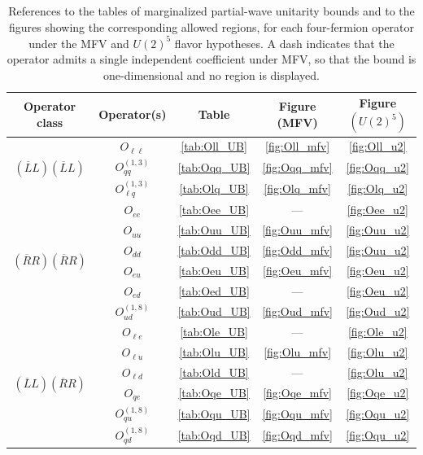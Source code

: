 \begin{table}[htbp]
\renewcommand{\arraystretch}{1.2}
    \centering
    \begin{tabular}{ccccc}
    \toprule
    \rowcolor{hdrcolor} \textbf{Operator class} & \textbf{Operator(s)} & \textbf{Table} & \textbf{Figure (MFV)} & \textbf{Figure} \boldmath$(U(2)^5)$ \\
    \midrule
    \multirow{3}{*}{\boldmath$(\overline LL)(\overline LL)$} & $O_{\ell \ell}$ & \ref{tab:Oll_UB} & \ref{fig:Oll_mfv} & \ref{fig:Oll_u2} \\
    & $O_{qq}^{(1,3)}$ & \ref{tab:Oqq_UB} & \ref{fig:Oqq_mfv} & \ref{fig:Oqq_u2} \\
    & $O_{\ell q}^{(1,3)}$ & \ref{tab:Olq_UB} & \ref{fig:Olq_mfv} & \ref{fig:Olq_u2} \\
    \midrule
    \multirow{6}{*}{\boldmath$(\overline RR)(\overline RR)$} & $O_{ee}$ & \ref{tab:Oee_UB} & --- & \ref{fig:Oee_u2} \\
    & $O_{uu}$ & \ref{tab:Ouu_UB} & \ref{fig:Ouu_mfv} & \ref{fig:Ouu_u2} \\
    & $O_{dd}$ & \ref{tab:Odd_UB} & \ref{fig:Odd_mfv} & \ref{fig:Ouu_u2} \\
    & $O_{eu}$ & \ref{tab:Oeu_UB} & \ref{fig:Oeu_mfv} & \ref{fig:Oeu_u2} \\
    & $O_{ed}$ & \ref{tab:Oed_UB} & --- & \ref{fig:Oeu_u2} \\
    & $O_{ud}^{(1,8)}$ & \ref{tab:Oud_UB} & \ref{fig:Oud_mfv} & \ref{fig:Oud_u2} \\
    \midrule
    \multirow{6}{*}{\boldmath$(\overline LL)(\overline RR)$} & $O_{\ell e}$ & \ref{tab:Ole_UB} & --- & \ref{fig:Ole_u2} \\
    & $O_{\ell u}$ & \ref{tab:Olu_UB} & \ref{fig:Olu_mfv} & \ref{fig:Olu_u2} \\
    & $O_{\ell d}$ & \ref{tab:Old_UB} & --- & \ref{fig:Olu_u2} \\
    & $O_{qe}$ & \ref{tab:Oqe_UB} & \ref{fig:Oqe_mfv} & \ref{fig:Oqe_u2} \\
    & $O_{qu}^{(1,8)}$ & \ref{tab:Oqu_UB} & \ref{fig:Oqu_mfv} & \ref{fig:Oqu_u2} \\
    & $O_{qd}^{(1,8)}$ & \ref{tab:Oqd_UB} & \ref{fig:Oqd_mfv} & \ref{fig:Oqu_u2} \\
    \bottomrule
    \end{tabular}
    \caption{References to the tables of marginalized partial-wave unitarity bounds and to the
    figures showing the corresponding allowed regions, for each four-fermion operator under the MFV
    and $U(2)^5$ flavor hypotheses. A dash indicates that the operator admits a single independent
    coefficient under MFV, so that the bound is one-dimensional and no region is displayed.}
    \label{tab:summary}
\end{table}